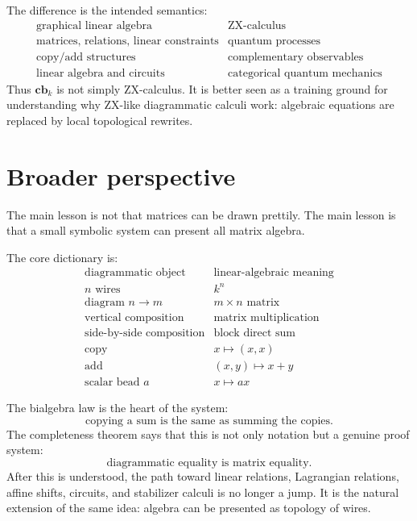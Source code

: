 The difference is the intended semantics:
\[
\begin{array}{c|c}
\text{graphical linear algebra} & \text{ZX-calculus}\\
\hline
\text{matrices, relations, linear constraints} & \text{quantum processes}\\
\text{copy/add structures} & \text{complementary observables}\\
\text{linear algebra and circuits} & \text{categorical quantum mechanics}
\end{array}
\]
Thus \(\mathbf{cb}_k\) is not simply ZX-calculus.  It is better seen as a training ground for understanding why ZX-like diagrammatic calculi work: algebraic equations are replaced by local topological rewrites.

\section{Broader perspective}

The main lesson is not that matrices can be drawn prettily.  The main lesson is that a small symbolic system can present all matrix algebra.

The core dictionary is:
\[
\begin{array}{c|c}
\text{diagrammatic object} & \text{linear-algebraic meaning}\\
\hline
n\text{ wires} & k^n\\
\text{diagram }n\to m & m\times n\text{ matrix}\\
\text{vertical composition} & \text{matrix multiplication}\\
\text{side-by-side composition} & \text{block direct sum}\\
\text{copy} & x\mapsto(x,x)\\
\text{add} & (x,y)\mapsto x+y\\
\text{scalar bead }a & x\mapsto ax
\end{array}
\]

The bialgebra law is the heart of the system:
\[
  \text{copying a sum is the same as summing the copies.}
\]
The completeness theorem says that this is not only notation but a genuine proof system:
\[
  \text{diagrammatic equality is matrix equality.}
\]
After this is understood, the path toward linear relations, Lagrangian relations, affine shifts, circuits, and stabilizer calculi is no longer a jump.  It is the natural extension of the same idea: algebra can be presented as topology of wires.
